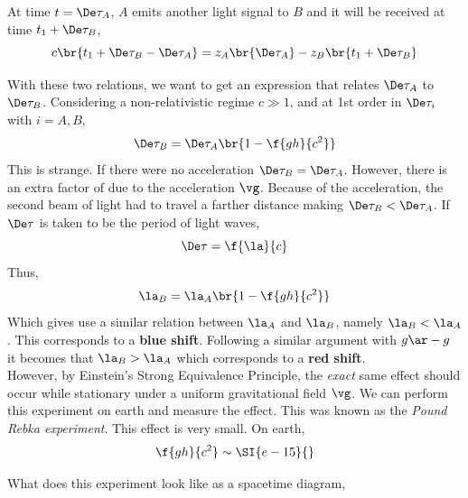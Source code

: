 \documentclass{article}
\begin{document}
At time $t = \De \tau_A$, $A$ emits another light signal to $B$ and it will be received at time $t_1 + \De \tau_B$,
\[ c\br{t_1 + \De \tau_B - \De \tau_A} = z_A\br{\De\tau_A} - z_B \br{t_1 + \De \tau_B} \]

With these two relations, we want to get an expression that relates $\De \tau_A$ to $\De \tau_B$. Considering a non-relativistic regime $c \gg 1$, and at 1st order in $\De \tau_i$ with $i = A,B$,
\[ \De \tau_B = \De \tau_A \br{1 - \f{gh}{c^2}} \]
This is strange. If there were no acceleration $\De \tau_B = \De \tau_A$. However, there is an extra factor of due to the acceleration $\vg$. Because of the acceleration, the second beam of light had to travel a farther distance making $\De \tau_B < \De \tau_A$. If $\De \tau$ is taken to be the period of light waves,
\[ \De \tau = \f{\la}{c} \]
Thus,
\[ \la_B = \la_A \br{1 - \f{gh}{c^2}} \]
Which gives use a similar relation between $\la_A$ and $\la_B$, namely $\la_B < \la_A$. This corresponds to a \textbf{blue shift}. Following a similar argument with $g \ar - g$ it becomes that $\la_B > \la_A$ which corresponds to a \textbf{red shift}. \\

However, by Einstein's Strong Equivalence Principle, the \textit{exact} same effect should occur while stationary under a uniform gravitational field $\vg$. We can perform this experiment on earth and measure the effect. This was known as the \textit{Pound Rebka experiment}. This effect is very small. On earth,
\[ \f{gh}{c^2} \sim \SI{e-15}{} \]

What does this experiment look like as a spacetime diagram,


\begin{center}
\end{center}
\end{document}
